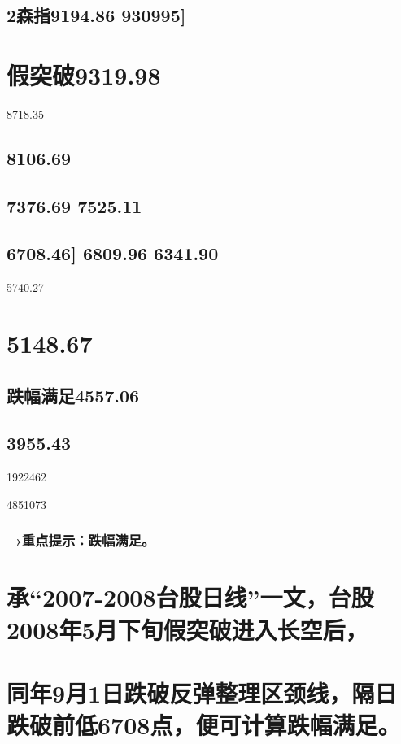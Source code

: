 \documentclass{article}
\begin{document}
\subsection{2森指9194.86 930995]}

\section{假突破9319.98}

8718.35

\subsection{8106.69}

\subsection{7376.69 7525.11}

\subsection{6708.46] 6809.96 6341.90}

5740.27

\section{5148.67}

\subsection{跌幅满足4557.06}

\subsection{3955.43}

1922462

4851073

\subsubsection{→重点提示：跌幅满足。}

\section{承“2007-2008台股日线”一文，台股2008年5月下旬假突破进入长空后，}

\section{同年9月1日跌破反弹整理区颈线，隔日跌破前低6708点，便可计算跌幅满足。}
\end{document}
